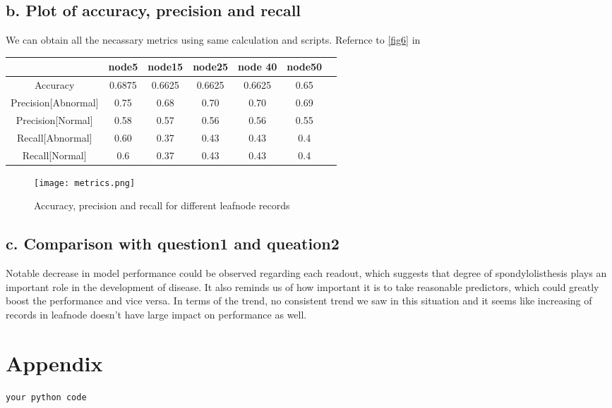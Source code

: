 \documentclass{article}
\begin{document}
\subsection*{b. Plot of accuracy, precision and recall}
We can obtain all the necassary metrics using same calculation and scripts. Refernce to \autoref{fig6} in \pageref{fig6}
\begin{center}
    \begin{tabular}{|c|c|c|c|c|c|c|}
    \hline
     & node5 & node15 & node25 &node 40 & node50 \\
    \hline
    Accuracy & 0.6875 & 0.6625 & 0.6625 & 0.6625 & 0.65\\
    \hline
    Precision[Abnormal] & 0.75 & 0.68 & 0.70 & 0.70 & 0.69\\
    \hline
    Precision[Normal] & 0.58 & 0.57 & 0.56 & 0.56 & 0.55\\
    \hline
    Recall[Abnormal] & 0.60 & 0.37 & 0.43 & 0.43 & 0.4\\
    \hline
    Recall[Normal] & 0.6&0.37&0.43&0.43&0.4\\
    \hline
    \end{tabular}
\end{center}
\begin{figure}[H]
    \centering
    \texttt{[image: metrics.png]}
    \caption{Accuracy, precision and recall for different leafnode records}
    \label{fig6}
\end{figure}
\subsection*{c. Comparison with question1 and queation2}
Notable decrease in model performance could be observed regarding each readout, which suggests that degree of spondylolisthesis plays an important role in the development of disease. It also reminds us of how important it is to take reasonable predictors, which could greatly boost the performance and vice versa. In terms of the trend, no consistent trend we saw in this situation and it seems like increasing of records in leafnode doesn't have large impact on performance as well.

\section{Appendix}
\begin{lstlisting}[language=Python, caption=Python Code]
your python code
\end{lstlisting}


\section{}
\end{document}

